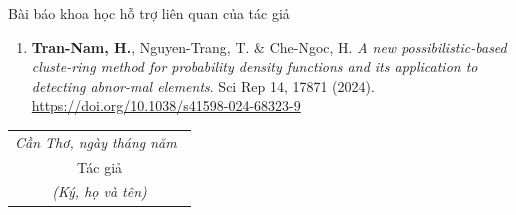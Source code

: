 Bài báo khoa học hỗ trợ liên quan của tác giả

\begin{enumerate}[label=(\roman*)]
\item \textbf{Tran-Nam, H.}, Nguyen-Trang, T. \& Che-Ngoc, H. \textit{A new possibilistic-based cluste-ring method for probability density functions and its application to detecting abnor-mal elements}. Sci Rep 14, 17871 (2024). {\footnotesize \url{https://doi.org/10.1038/s41598-024-68323-9}}
\end{enumerate}

\hspace*{\fill}
\begin{tabular}{@{}c@{}} 
	\\\it 
	Cần Thơ, ngày \quad tháng \quad năm \qquad\,\\
	Tác giả\\
	\textit{(Ký, họ và tên)}
	
\end{tabular}
